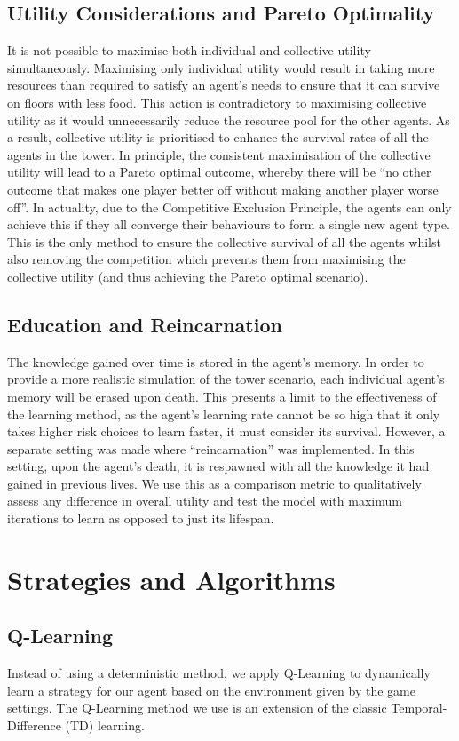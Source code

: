 \subsection{Utility Considerations and Pareto Optimality}
It is not possible to maximise both individual and collective utility simultaneously. Maximising only individual utility would result in taking more resources than required to satisfy an agent’s needs to ensure that it can survive on floors with less food. This action is contradictory to maximising collective utility as it would unnecessarily reduce the resource pool for the other agents. As a result, collective utility is prioritised to enhance the survival rates of all the agents in the tower. In principle, the consistent maximisation of the collective utility will lead to a Pareto optimal outcome, whereby there will be “no other outcome that makes one player better off without making another player worse off”. In actuality, due to the Competitive Exclusion Principle, the agents can only achieve this if they all converge their behaviours to form a single new agent type. This is the only method to ensure the collective survival of all the agents whilst also removing the competition which prevents them from maximising the collective utility (and thus achieving the Pareto optimal scenario). 
\subsection{Education and Reincarnation}
The knowledge gained over time is stored in the agent’s memory. In order to provide a more realistic simulation of the tower scenario, each individual agent’s memory will be erased upon death. This presents a limit to the effectiveness of the learning method, as the agent’s learning rate cannot be so high that it only takes higher risk choices to learn faster, it must consider its survival. However, a separate setting was made where “reincarnation” was implemented. In this setting, upon the agent’s death, it is respawned with all the knowledge it had gained in previous lives. We use this as a comparison metric to qualitatively assess any difference in overall utility and test the model with maximum iterations to learn as opposed to just its lifespan.
\section{Strategies and Algorithms}
\subsection{Q-Learning}
Instead of using a deterministic method, we apply Q-Learning to dynamically learn a strategy for our agent based on the environment given by the game settings. The Q-Learning method we use is an extension of the classic Temporal-Difference (TD) learning.
